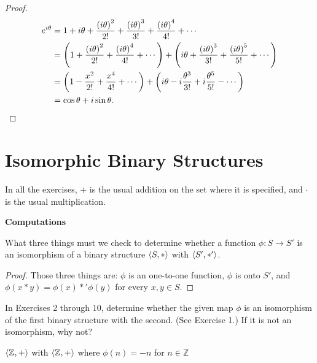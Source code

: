 \begin{proof}
    \begin{align*}
        e^{i\theta} & = 1 + i\theta + \frac{{(i\theta)}^{2}}{2!} + \frac{{(i\theta)}^{3}}{3!} + \frac{{(i\theta)}^{4}}{4!} + \cdots                                                                 \\
                    & = \left(1 + \frac{{(i\theta)}^{2}}{2!} + \frac{{(i\theta)}^{4}}{4!} + \cdots\right) + \left(i\theta + \frac{{(i\theta)}^{3}}{3!} + \frac{{(i\theta)}^{5}}{5!} + \cdots\right) \\
                    & = \left(1 - \frac{x^{2}}{2!} + \frac{x^{4}}{4!} + \cdots \right) + \left(i\theta - i\frac{\theta^{3}}{3!} + i\frac{\theta^{5}}{5!} - \cdots \right)                           \\
                    & = \cos{\theta} + i\sin{\theta}.\qedhere
    \end{align*}
\end{proof}

\section{Isomorphic Binary Structures}
\setcounter{exercise}{0}

In all the exercises, $+$ is the usual addition on the set where it is specified, and $\cdot$ is the usual multiplication.

\textbf{Computations}

\begin{exercise}
    What three things must we check to determine whether a function $\phi: S\to S'$ is an isomorphism of a binary structure $\left\langle{S, *}\right\rangle$ with $\left\langle{S', *'}\right\rangle$.
\end{exercise}

\begin{proof}
    Those three things are: $\phi$ is an one-to-one function, $\phi$ is onto $S'$, and $\phi(x * y) = \phi(x) *' \phi(y)$ for every $x, y\in S$.
\end{proof}

In Exercises 2 through 10, determine whether the given map $\phi$ is an isomorphism of the first binary structure with the second. (See Exercise 1.) If it is not an isomorphism, why not?

\begin{exercise}
    $\left\langle{\mathbb{Z}, +}\right\rangle$ with $\left\langle{\mathbb{Z}, +}\right\rangle$ where $\phi(n) = -n$ for $n\in\mathbb{Z}$
\end{exercise}

